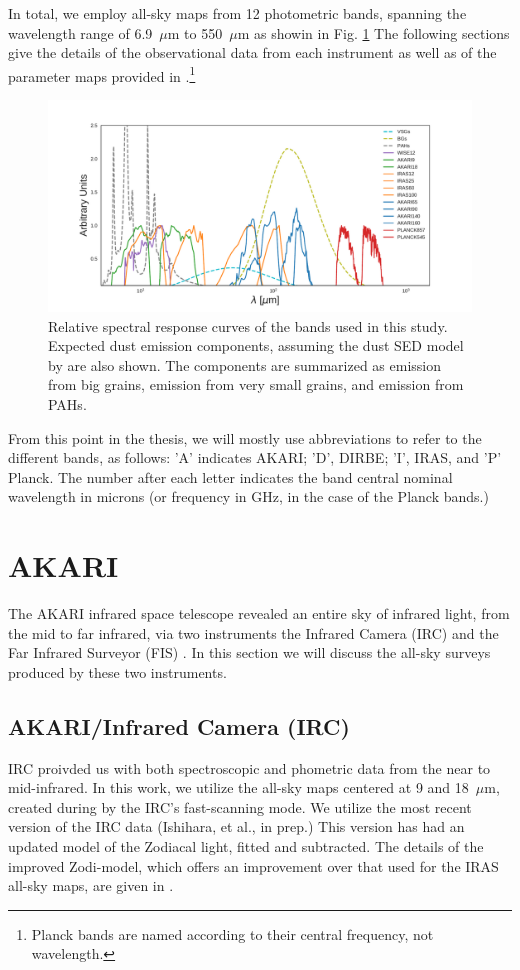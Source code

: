     In total, we employ all-sky maps from 12 photometric bands, spanning the wavelength range of 6.9~$\mu$m to 550~$\mu$m as showin in Fig. \ref{fig:Filter_coverage_example_full} The following sections give the details of the observational data from each instrument as well as of the parameter maps provided in \cite{planck15X}.\footnote{Planck bands are named according to their central frequency, not wavelength.}
    \begin{figure}
      \centering
      \includegraphics[width=\textwidth]{../Plots/ch_datasources/Filter_coverage_example_full.pdf}
      \caption{Relative spectral response curves of the bands used in this study. Expected dust emission components, assuming the dust SED model by \citep{dustem11} are also shown. The components are summarized as emission from big grains, emission from very small grains, and emission from PAHs.}
      \label{fig:Filter_coverage_example_full}
    \end{figure}
    From this point in the thesis, we will mostly use abbreviations to refer to the different bands, as follows: 'A' indicates AKARI; 'D', DIRBE; 'I', IRAS, and 'P' Planck. The number after each letter indicates the band central nominal wavelength in microns (or frequency in GHz, in the case of the Planck bands.)

  \section{AKARI}

       The AKARI infrared space telescope revealed an entire sky of infrared light, from the mid to far infrared, via two instruments \citep{akari07} the Infrared Camera (IRC)\citep{irc07} and the Far Infrared Surveyor (FIS) \citep{fis07}. In this section we will discuss the all-sky surveys produced by these two instruments.

       \subsection{AKARI/Infrared Camera (IRC) }
           IRC proivded us with both spectroscopic and phometric data from the near to mid-infrared. In this work, we utilize the all-sky maps centered at 9 and 18~$\mu$m, created during by the IRC's fast-scanning mode. We utilize the most recent version of the IRC data (Ishihara, et al., in prep.) This version has had an updated model of the Zodiacal light, fitted and subtracted. The details of the improved Zodi-model, which offers an improvement over that used for the IRAS all-sky maps, are given in \cite{kondo16}.

